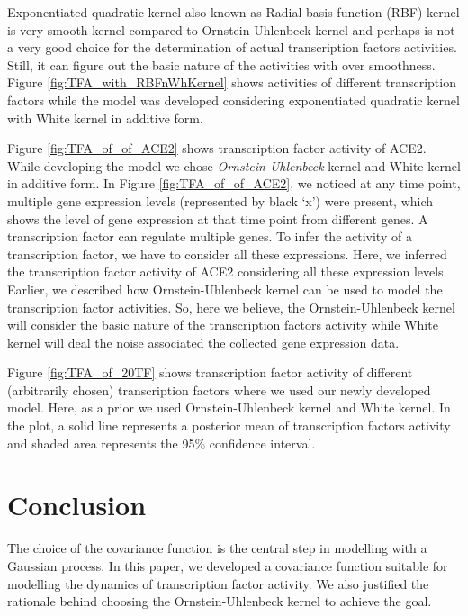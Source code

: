 Exponentiated quadratic kernel also known as Radial basis function (RBF) kernel is very smooth kernel compared to Ornstein-Uhlenbeck kernel and perhaps is not a very good choice for the determination of actual transcription factors activities. Still, it can figure out the basic nature of the activities with over smoothness. Figure \ref{fig:TFA_with_RBFnWhKernel} shows activities of different transcription factors while the model was developed considering exponentiated quadratic kernel with White kernel in additive form.

Figure \ref{fig:TFA_of_of_ACE2} shows transcription factor activity of ACE2. While developing the model we chose \emph{Ornstein-Uhlenbeck} kernel and White kernel in additive form. In Figure \ref{fig:TFA_of_of_ACE2}, we noticed at any time point, multiple gene expression levels (represented by black \lq x\rq) were present, which shows the level of gene expression at that time point from different genes. A transcription factor can regulate multiple genes. To infer the activity of a transcription factor, we have to consider all these expressions. Here, we inferred the transcription factor activity of ACE2 considering all these expression levels. Earlier, we described how  Ornstein-Uhlenbeck kernel can be used to model the transcription factor activities. So, here we believe, the Ornstein-Uhlenbeck kernel will consider the basic nature of the transcription factors activity while White kernel will deal the noise associated the collected gene expression data.

Figure \ref{fig:TFA_of_20TF} shows transcription factor activity of different (arbitrarily chosen) transcription factors  where we used our newly developed model. Here, as a prior we used Ornstein-Uhlenbeck kernel and White kernel. In the plot, a solid line represents a posterior mean of transcription factors activity and shaded area represents the 95\% confidence interval.

\section{Conclusion}
 The choice of the covariance function is the central step in modelling with a Gaussian process. In this paper, we developed a covariance function suitable for modelling the dynamics of transcription factor activity. We also justified the rationale behind choosing the Ornstein-Uhlenbeck kernel to achieve the goal.  
 
